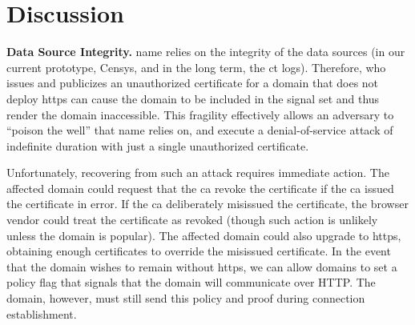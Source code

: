 \section{Discussion}
\label{sec:discussion}

\textbf{Data Source Integrity.} \ac{name} relies on the integrity of the data
sources (in our current prototype, Censys, and in the long term, the \ac{ct}
logs). Therefore,  who issues and publicizes an unauthorized certificate
for a domain that does not deploy \ac{https} can cause the domain to be included
in the signal set and thus render the domain inaccessible. This fragility
effectively allows an adversary to ``poison the well'' that \ac{name} relies on,
and execute a denial-of-service attack of indefinite duration with just a single
unauthorized certificate.

Unfortunately, recovering from such an attack requires immediate action. The
affected domain could request that the \ac{ca} revoke the certificate if the
\ac{ca} issued the certificate in error. If the \ac{ca} deliberately misissued
the certificate, the browser vendor could treat the certificate as revoked
(though such action is unlikely unless the domain is popular). The affected
domain could also upgrade to \ac{https}, obtaining enough certificates to
override the misissued certificate. In the event that the domain wishes to
remain without \ac{https}, we can allow domains to set a policy flag that
signals that the domain will communicate over HTTP. The domain, however, must
still send this policy and proof during connection establishment.

